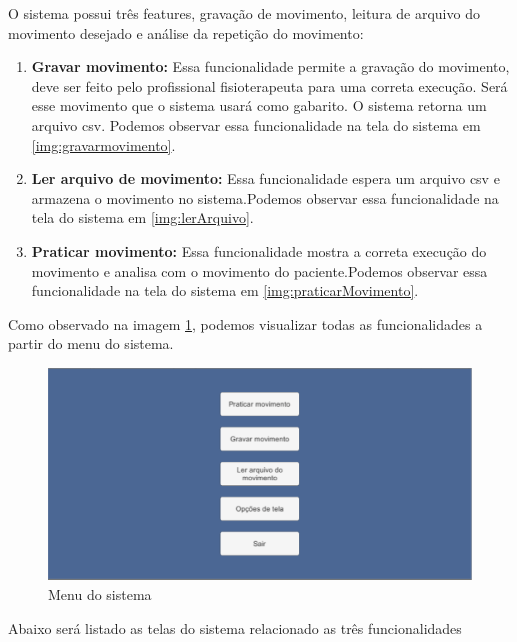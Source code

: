      O sistema possui três features, gravação de movimento, leitura de arquivo do movimento desejado e análise da repetição do movimento:
   \begin{enumerate}
     \item \textbf{Gravar movimento:} Essa funcionalidade permite a gravação do movimento, deve ser feito pelo profissional fisioterapeuta
     para uma correta execução. Será esse movimento que o sistema usará como gabarito. O sistema retorna um arquivo csv. Podemos observar essa funcionalidade
     na tela do sistema em \ref{img:gravarmovimento}.

     \item \textbf{Ler arquivo de movimento:} Essa funcionalidade espera um arquivo csv e armazena o movimento no sistema.Podemos observar essa funcionalidade
     na tela do sistema em \ref{img:lerArquivo}.

     \item \textbf{Praticar movimento:} Essa funcionalidade mostra a correta execução do movimento e analisa com o movimento do paciente.Podemos observar essa funcionalidade
     na tela do sistema em \ref{img:praticarMovimento}.

   \end{enumerate}

   Como observado na imagem \ref{img:menu}, podemos visualizar todas as funcionalidades a partir do menu do sistema.

   \begin{figure}[H]
   \centering
   \includegraphics [keepaspectratio=true,scale=0.40]{figuras/menu.eps}
   \caption{Menu do sistema}
   \label{img:menu}
   \end{figure}

     Abaixo será listado as telas do sistema relacionado as três funcionalidades

